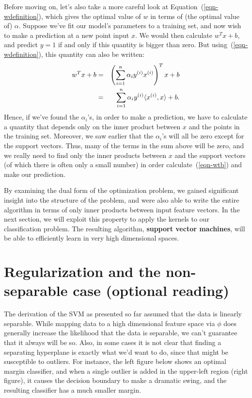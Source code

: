 \documentclass{article}
\begin{document}
Before moving on, let's also take a more careful look at Equation~(\ref{eqn-wdefinition}), which gives
the optimal value of $w$ in terms of (the optimal value of) $\alpha$.  Suppose we've fit our
model's parameters
to a training set, and now wish to make a prediction at a new point input $x$.  We would then
calculate $w^Tx + b$, and predict $y=1$ if and only if this quantity is bigger than zero.  But
using~(\ref{eqn-wdefinition}), this quantity can also be written:
\begin{eqnarray}
w^Tx + b &=& \left(\sum_{i=1}^{n} \alpha_i {y^{(i)}} {x^{(i)}}\right)^Tx + b \\
&=& \sum_{i=1}^{n} \alpha_i {y^{(i)}} \langle {x^{(i)}}, x \rangle + b. \label{eqn-wtb}
\end{eqnarray}
Hence, if we've found the $\alpha_i$'s, in order to make a prediction, we have to calculate
a quantity that depends only on the inner product between $x$ and the points in
the training set.  Moreover, we saw earlier that the $\alpha_i$'s will all be zero except
for the support vectors.  Thus, many of the terms in the sum above will be zero, and we
really need to find only the inner products between $x$ and the support vectors (of
which there is often only a small number) in order calculate~(\ref{eqn-wtb}) and make our prediction.

By examining the dual form of the optimization problem,
we gained significant insight into the structure of the problem,
and were also able to write the entire algorithm in terms of only inner products between
input feature vectors.  In the next section, we will exploit this property to
apply the kernels to our classification problem.  The resulting algorithm, {\bf support vector machines},
will be able to efficiently learn in very high dimensional spaces.



\section{Regularization and the non-separable case (optional reading)}

The derivation of the SVM as presented so far assumed that the data is linearly separable.
While mapping data to a high dimensional feature space via $\phi$ does generally increase
the likelihood that the data is separable, we can't guarantee that it always will be so.
Also, in some cases it is not clear that finding a separating hyperplane is exactly what we'd want
to do, since that might
be susceptible to outliers.  For instance, the left figure below shows an optimal margin classifier,
and when a single outlier is added in the upper-left region (right figure), it causes the decision
boundary to make a dramatic swing, and the resulting classifier has a much smaller margin.
\end{document}

